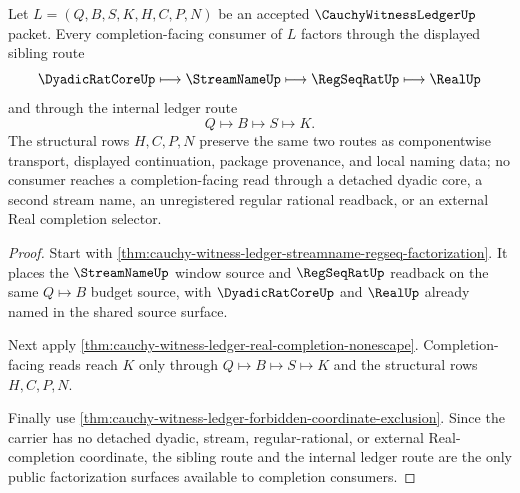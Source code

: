 \begin{theorem}
\label{thm:cauchy-witness-ledger-completion-consumer-factorization}
Let $L=(Q,B,S,K,H,C,P,N)$ be an accepted $\CauchyWitnessLedgerUp$ packet. Every completion-facing consumer of $L$ factors through the displayed sibling route
$$
\DyadicRatCoreUp \longmapsto \StreamNameUp \longmapsto \RegSeqRatUp \longmapsto \RealUp
$$
and through the internal ledger route
$$
Q \longmapsto B \longmapsto S \longmapsto K.
$$
The structural rows $H,C,P,N$ preserve the same two routes as componentwise transport, displayed continuation, package provenance, and local naming data; no consumer reaches a completion-facing read through a detached dyadic core, a second stream name, an unregistered regular rational readback, or an external Real completion selector.
\end{theorem}
\begin{proof}
Start with \autoref{thm:cauchy-witness-ledger-streamname-regseq-factorization}. It places the $\StreamNameUp$ window source and $\RegSeqRatUp$ readback on the same $Q \longmapsto B$ budget source, with $\DyadicRatCoreUp$ and $\RealUp$ already named in the shared source surface.

Next apply \autoref{thm:cauchy-witness-ledger-real-completion-nonescape}. Completion-facing reads reach $K$ only through $Q \longmapsto B \longmapsto S \longmapsto K$ and the structural rows $H,C,P,N$.

Finally use \autoref{thm:cauchy-witness-ledger-forbidden-coordinate-exclusion}. Since the carrier has no detached dyadic, stream, regular-rational, or external Real-completion coordinate, the sibling route and the internal ledger route are the only public factorization surfaces available to completion consumers.
\end{proof}

